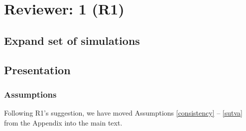 \documentclass[hidelinks,12pt,letterpaper]{article}
\begin{document}
 

\tableofcontents

\pagebreak

\section{Reviewer: 1 (R1)}

\subsection{Expand set of simulations}



\subsection{Presentation}

\subsubsection{Assumptions}

Following R1's suggestion, we have moved Assumptions \ref{consistency} -- \ref{sutva} from the Appendix into the main text. 
\end{document}
